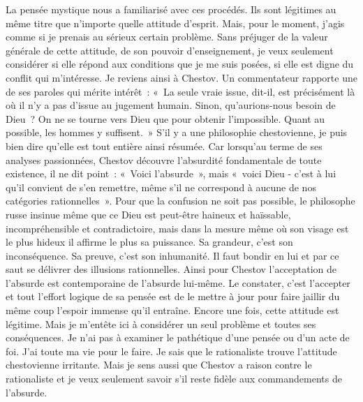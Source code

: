 \documentclass{book}
\begin{document}
La pensée mystique nous a familiarisé avec ces procédés. Ils sont légitimes au même titre que n'importe quelle attitude d'esprit. Mais, pour le moment, j'agis comme si je prenais au sérieux certain problème. Sans préjuger de la valeur générale de cette attitude, de son pouvoir d'enseignement, je veux seulement considérer si elle répond aux conditions que je me suis posées, si elle est digne du conflit qui m'intéresse. Je reviens ainsi à Chestov. Un commentateur rapporte une de ses paroles qui mérite intérêt : « La seule vraie issue, dit-il, est précisément là où il n'y a pas d'issue au jugement humain. Sinon, qu'aurions-nous besoin de Dieu ? On ne se tourne vers Dieu que pour obtenir l'impossible. Quant au possible, les hommes y suffisent. » S'il y a une philosophie chestovienne, je puis bien dire qu'elle est tout entière ainsi résumée. Car lorsqu'au terme de ses analyses passionnées, Chestov découvre l'absurdité fondamentale de toute existence, il ne dit point : « Voici l'absurde », mais « voici Dieu - c'est à lui qu'il convient de s'en remettre, même s'il ne correspond à aucune de nos catégories rationnelles ». Pour que la confusion ne soit pas possible, le philosophe russe insinue même que ce Dieu est peut-être haineux et haïssable, incompréhensible et contradictoire, mais dans la mesure même où son visage est le plus hideux il affirme le plus sa puissance. Sa grandeur, c'est son inconséquence. Sa preuve, c'est son inhumanité. Il faut bondir en lui et par ce saut se délivrer des illusions rationnelles. Ainsi pour Chestov l'acceptation de l'absurde est contemporaine de l'absurde lui‑même. Le constater, c'est l'accepter et tout l'effort logique de sa pensée est de le mettre à jour pour faire jaillir du même coup l'espoir immense qu'il entraîne. Encore une fois, cette attitude est légitime. Mais je m'entête ici à considérer un seul problème et toutes ses conséquences. Je n'ai pas à examiner le pathétique d'une pensée ou d'un acte de foi. J'ai toute ma vie pour le faire. Je sais que le rationaliste trouve l'attitude chestovienne irritante. Mais je sens aussi que Chestov a raison contre le rationaliste et je veux seulement savoir s'il reste fidèle aux commandements de l'absurde.
\end{document}
